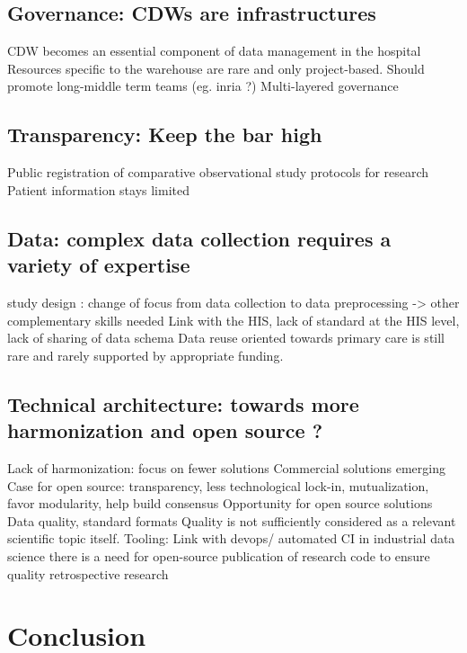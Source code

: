 \documentclass{report}
\begin{document}
\subsection{Governance: CDWs are
  infrastructures}\label{subsec:cdw:recommendations:governance}

CDW becomes an essential component of data management in the hospital Resources
specific to the warehouse are rare and only project-based. Should promote
long-middle term teams (eg. inria ?) Multi-layered governance

\subsection{Transparency: Keep the bar
  high}\label{subsec:cdw:recommendations:transparency} Public registration of
comparative observational study protocols for research Patient information stays
limited

\subsection{Data: complex data collection requires a variety of
  expertise}\label{subsec:cdw:recommendations:data} study design : change of
focus from data collection to data preprocessing -> other complementary skills
needed Link with the HIS, lack of standard at the HIS level, lack of sharing of
data schema Data reuse oriented towards primary care is still rare and rarely
supported by appropriate funding.


\subsection{Technical architecture: towards more harmonization and open source ?
}\label{subsec:cdw:recommendations:architecture} Lack of harmonization: focus on
fewer solutions Commercial solutions emerging Case for open source:
transparency, less technological lock-in, mutualization, favor modularity, help
build consensus Opportunity for open source solutions Data quality, standard
formats Quality is not sufficiently considered as a relevant scientific topic
itself. Tooling: Link with devops/ automated CI in industrial data science there
is a need for open-source publication of research code to ensure quality
retrospective research

\section{Conclusion}\label{sec:cdw:conclusion}
\end{document}

